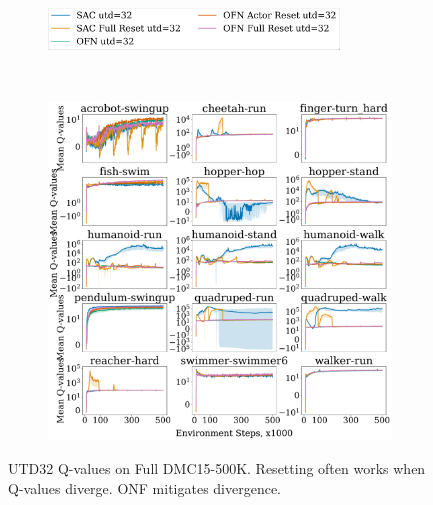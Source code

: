\begin{figure}[H]
\centering
    \begin{subfigure}[b]{0.8\textwidth}
        \centering
        \includegraphics[height=1.1cm]{figures/dissecting/main_exp/utd_32_Q_legend.pdf}
    \end{subfigure}\\%
    \begin{subfigure}[b]{1\textwidth}
        \centering
        \includegraphics[width=15cm, trim=0cm 0cm 0cm 0cm ,clip]{figures/dissecting/main_exp/utd_32_Q.pdf}
    \end{subfigure}%
    \vspace{-5pt}
    \caption{UTD32 Q-values on Full DMC15-500K. Resetting often works when Q-values diverge. ONF mitigates divergence.}
    \label{fig:utd32_Q}
\end{figure}

\newpage

